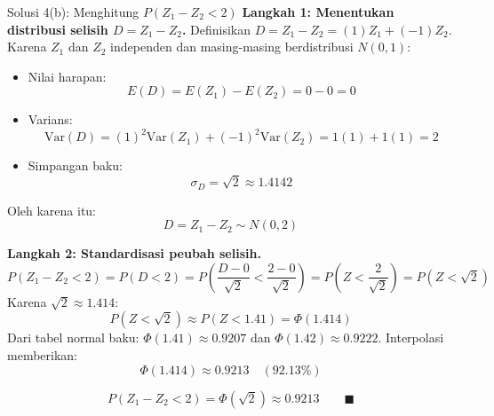 \documentclass[10pt,twoside]{article}
\begin{document}
\begin{solbox}{Solusi 4(b): Menghitung $P(Z_1 - Z_2 < 2)$}
\textbf{Langkah 1: Menentukan distribusi selisih $D = Z_1 - Z_2$.}
Definisikan $D = Z_1 - Z_2 = (1)Z_1 + (-1)Z_2$.
Karena $Z_1$ dan $Z_2$ independen dan masing-masing berdistribusi $N(0, 1)$:
\begin{itemize}
  \item Nilai harapan:
  \[
  E(D) = E(Z_1) - E(Z_2) = 0 - 0 = 0
  \]
  \item Varians:
  \[
  \mathrm{Var}(D) = (1)^2 \mathrm{Var}(Z_1) + (-1)^2 \mathrm{Var}(Z_2) = 1(1) + 1(1) = 2
  \]
  \item Simpangan baku:
  \[
  \sigma_D = \sqrt{2} \approx 1.4142
  \]
\end{itemize}
Oleh karena itu:
\[
D = Z_1 - Z_2 \sim N(0, 2)
\]

\textbf{Langkah 2: Standardisasi peubah selisih.}
\[
P(Z_1 - Z_2 < 2) = P(D < 2) = P\left(\frac{D - 0}{\sqrt{2}} < \frac{2 - 0}{\sqrt{2}}\right) = P\left(Z < \frac{2}{\sqrt{2}}\right) = P(Z < \sqrt{2})
\]
Karena $\sqrt{2} \approx 1.414$:
\[
P(Z < \sqrt{2}) \approx P(Z < 1.41) = \Phi(1.414)
\]
Dari tabel normal baku: $\Phi(1.41) \approx 0.9207$ dan $\Phi(1.42) \approx 0.9222$.
Interpolasi memberikan:
\[
\Phi(1.414) \approx 0.9213 \quad (92.13\%)
\]

\[
\boxed{P(Z_1 - Z_2 < 2) = \Phi(\sqrt{2}) \approx 0.9213} \qquad \blacksquare
\]
\end{solbox}
\end{document}

